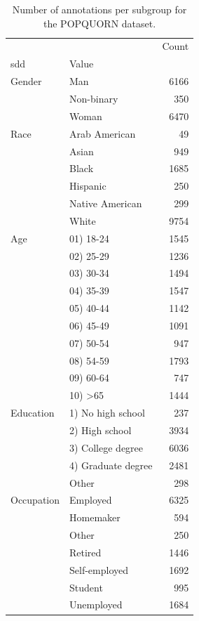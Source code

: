 \begin{table}[t]
\centering
\caption{Number of annotations per subgroup for the POPQUORN dataset.}
\label{tab:subgroups-popquorn}
\begin{tabular}{llr}
\toprule
 &  & Count \\
\ac{sdd} & Value &  \\
\midrule
Gender & Man & 6166 \\
 & Non-binary & 350 \\
 & Woman & 6470 \\
Race & Arab American & 49 \\
 & Asian & 949 \\
 & Black & 1685 \\
 & Hispanic & 250 \\
 & Native American & 299 \\
 & White & 9754 \\
Age & 01) 18-24 & 1545 \\
 & 02) 25-29 & 1236 \\
 & 03) 30-34 & 1494 \\
 & 04) 35-39 & 1547 \\
 & 05) 40-44 & 1142 \\
 & 06) 45-49 & 1091 \\
 & 07) 50-54 & 947 \\
 & 08) 54-59 & 1793 \\
 & 09) 60-64 & 747 \\
 & 10) >65 & 1444 \\
Education & 1) No high school & 237 \\
 & 2) High school & 3934 \\
 & 3) College degree & 6036 \\
 & 4) Graduate degree & 2481 \\
 & Other & 298 \\
Occupation & Employed & 6325 \\
 & Homemaker & 594 \\
 & Other & 250 \\
 & Retired & 1446 \\
 & Self-employed & 1692 \\
 & Student & 995 \\
 & Unemployed & 1684 \\
\bottomrule
\end{tabular}
\end{table}
